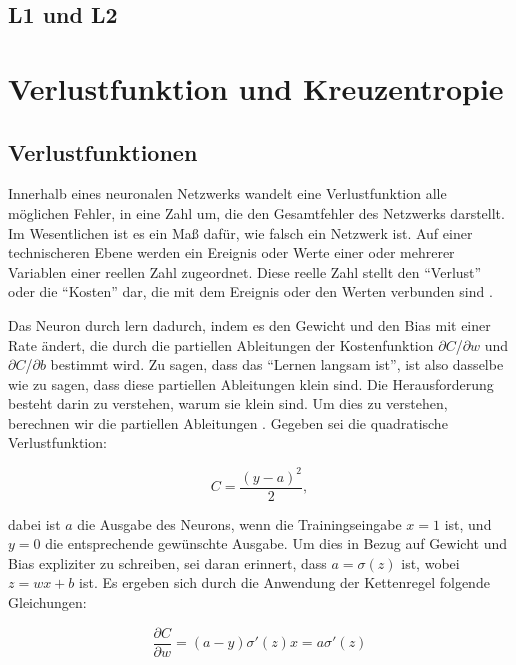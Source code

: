     \subsection{L1 und L2}






    \section{Verlustfunktion und Kreuzentropie}
    \subsection{Verlustfunktionen}
    Innerhalb eines neuronalen Netzwerks wandelt eine Verlustfunktion alle möglichen Fehler, in eine Zahl um, die den Gesamtfehler des Netzwerks darstellt. Im Wesentlichen ist es ein Maß dafür, wie falsch ein Netzwerk ist. Auf einer technischeren Ebene werden ein Ereignis oder Werte einer oder mehrerer Variablen einer reellen Zahl zugeordnet. Diese reelle Zahl stellt  den \enquote{Verlust} oder die \enquote{Kosten} dar, die mit dem Ereignis oder den Werten verbunden sind \cite*[61-62]{Taylor2017}.

    Das Neuron durch lern dadurch, indem es den Gewicht und den Bias mit einer Rate ändert, die durch die partiellen Ableitungen der Kostenfunktion $\partial$$C$/$\partial$$w$ und $\partial$$C$/$\partial$$b$ bestimmt wird. Zu sagen, dass  das \enquote{Lernen langsam ist}, ist also dasselbe wie zu sagen, dass diese partiellen Ableitungen klein sind. Die Herausforderung besteht darin zu verstehen, warum sie klein sind. Um dies zu verstehen, berechnen wir die partiellen Ableitungen \cite*[61]{Nielsen2015}. Gegeben sei die quadratische Verlustfunktion:

    \begin{equation} \label{Formel2_5}
      C=\frac{( y-a)^{2}}{2},
    \end{equation}

    dabei ist $a$ die Ausgabe des Neurons, wenn die Trainingseingabe $x = 1$ ist, und $y = 0$ die entsprechende gewünschte Ausgabe. Um dies in Bezug auf Gewicht und Bias expliziter zu schreiben, sei daran erinnert, dass $a = \sigma(z)$ ist, wobei $z = wx + b$ ist. Es ergeben sich durch die Anwendung der Kettenregel folgende Gleichungen:

    \begin{equation} \label{Formel2_6}
      \frac{\partial C}{\partial w} =( a-y) \sigma '( z) x=a\sigma '( z)
    \end{equation}

